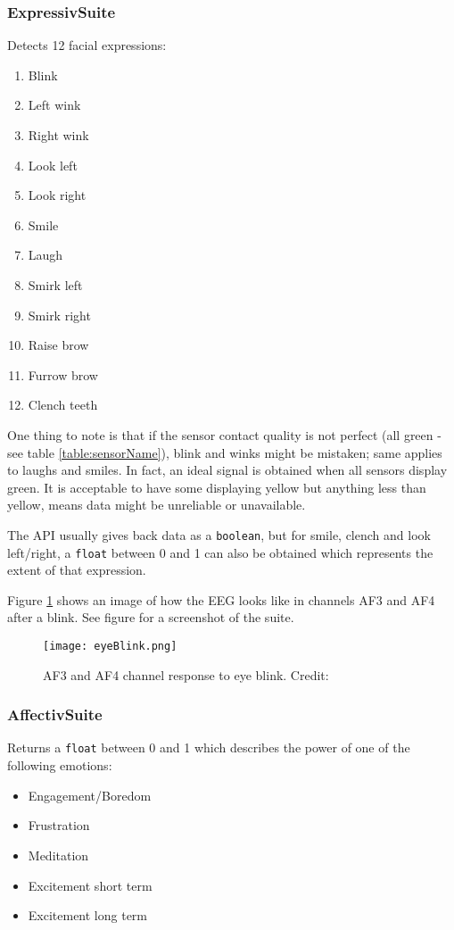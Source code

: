 \subsubsection{Expressiv\texttrademark  Suite}
Detects 12 facial expressions:
\begin{multicols}{2}
\begin{enumerate}
	\item Blink
	\item Left wink
	\item Right wink
	\item Look left
	\item Look right
	\item Smile
	\item Laugh
	\item Smirk left
	\item Smirk right
	\item Raise brow
	\item Furrow brow
	\item Clench teeth
\end{enumerate}
\end{multicols}
One thing to note is that if the sensor contact quality is not perfect (all green - see table \ref{table:sensorName}), blink and winks might be mistaken; same applies to laughs and smiles. In fact, an ideal signal is obtained when all sensors display green. It is acceptable to have some displaying yellow but anything less than yellow, means data might be unreliable or unavailable.
	
The API usually gives back data as a \texttt{boolean}, but for smile, clench and look left/right, a \texttt{float} between 0 and 1 can also be obtained which represents the extent of that expression. 

Figure \ref{fig:blinkAF} shows an image of how the EEG looks like in channels AF3 and AF4 after a blink. See figure for a screenshot of the suite.

\begin{figure}
  \centering
  \texttt{[image: eyeBlink.png]}
  \caption{AF3 and AF4 channel response to eye blink. Credit: \cite{experimenterEPOC}}
    \label{fig:blinkAF}           
\end{figure}

\subsubsection{Affectiv\texttrademark  Suite}
Returns a \texttt{float} between 0 and 1 which describes the power of one of the following emotions:
\begin{itemize}
	\item Engagement/Boredom
	\item Frustration
	\item Meditation
	\item Excitement short term
	\item Excitement long term
\end{itemize}

